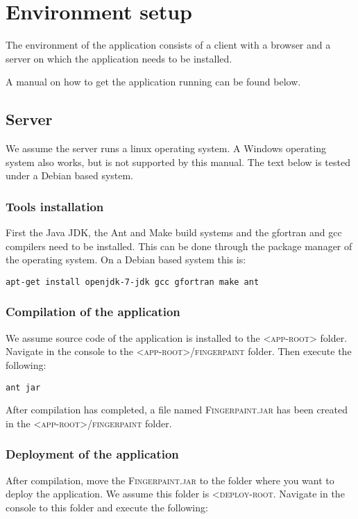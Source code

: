 \chapter{Environment setup}\label{environment_setup}
The environment of the \applicationname{} application consists of a client with a browser and a server on which the application needs to be installed.

A manual on how to get the \applicationname{} application running can be found below.

\section{Server}
We assume the server runs a linux operating system. A Windows operating system also works, but is not supported by this manual. The text below is tested under a Debian based system.

\subsection{Tools installation}
First the Java JDK, the Ant and Make build systems and the gfortran and gcc compilers need to be installed. This can be done through the package manager of the operating system. On a Debian based system this is:

\begin{verbatim}
apt-get install openjdk-7-jdk gcc gfortran make ant
\end{verbatim}

\subsection{Compilation of the application}
We assume source code of the application is installed to the \textsc{<app-root>} folder. Navigate in the console to the \textsc{<app-root>/fingerpaint} folder. Then execute the following:

\begin{verbatim}
ant jar
\end{verbatim}

After compilation has completed, a file named \textsc{Fingerpaint.jar} has been created in the \textsc{<app-root>/fingerpaint} folder.

\subsection{Deployment of the application}
After compilation, move the \textsc{Fingerpaint.jar} to the folder where you want to deploy the application. We assume this folder is \textsc{<deploy-root}. Navigate in the console to this folder and execute the following:

